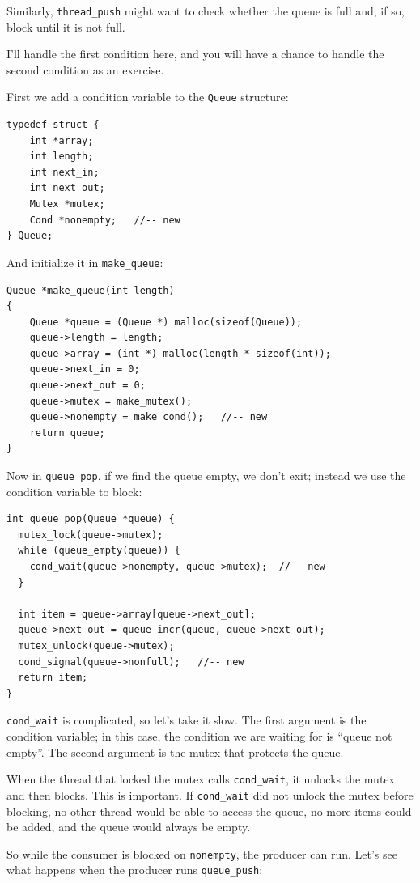 \documentclass[12pt]{book}
\begin{document}
{Similarly, \verb"thread_push" might want to check whether the queue is
full and, if so, block until it is not full.

I'll handle the first condition here, and you will have a chance to
handle the second condition as an exercise.

First we add a condition variable to the {\tt Queue} structure:

\begin{verbatim}
typedef struct {
    int *array;
    int length;
    int next_in;
    int next_out;
    Mutex *mutex;
    Cond *nonempty;   //-- new
} Queue;
\end{verbatim}

And initialize it in \verb"make_queue":

\begin{verbatim}
Queue *make_queue(int length)
{
    Queue *queue = (Queue *) malloc(sizeof(Queue));
    queue->length = length;
    queue->array = (int *) malloc(length * sizeof(int));
    queue->next_in = 0;
    queue->next_out = 0;
    queue->mutex = make_mutex();
    queue->nonempty = make_cond();   //-- new
    return queue;
}
\end{verbatim}

Now in \verb"queue_pop", if we find the queue empty, we don't
exit; instead we use the condition variable to block:

\begin{verbatim}
int queue_pop(Queue *queue) {
  mutex_lock(queue->mutex);
  while (queue_empty(queue)) {
    cond_wait(queue->nonempty, queue->mutex);  //-- new
  }
  
  int item = queue->array[queue->next_out];
  queue->next_out = queue_incr(queue, queue->next_out);
  mutex_unlock(queue->mutex);
  cond_signal(queue->nonfull);   //-- new
  return item;
}
\end{verbatim}

\verb"cond_wait" is complicated, so let's take it slow.  
The first argument is the condition variable; in this case,
the condition we are waiting for is ``queue not empty''.  The second
argument is the mutex that protects the queue.

When the thread that locked the mutex calls \verb"cond_wait", it
unlocks the mutex and then blocks.  This is important.  If
\verb"cond_wait" did not unlock the mutex before blocking, no
other thread would be able to access the queue, no more items
could be added, and the queue would always be empty.

So while the consumer is blocked on {\tt nonempty}, the producer can
run.  Let's see what happens when the producer runs \verb"queue_push":

}
\end{document}
